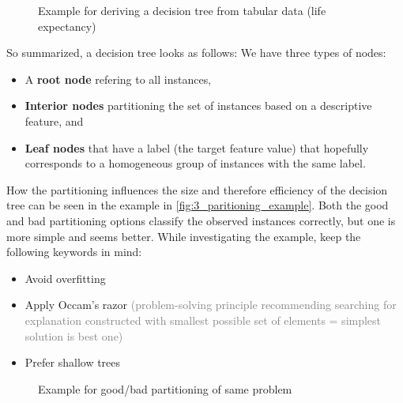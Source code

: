 \begin{figure}[h]
  \centering
  \caption{Example for deriving a decision tree from tabular data (life expectancy)}
  \label{fig:3_smoke_tree_example}
\end{figure}

So summarized, a decision tree looks as follows: We have three types of nodes:
\begin{itemize}
  \item A \textbf{root node} refering to all instances,
  \item \textbf{Interior nodes} partitioning the set of instances based on a descriptive feature, and
  \item \textbf{Leaf nodes} that have a label (the target feature value) that hopefully corresponds to a homogeneous group of instances with the same label.
\end{itemize}

How the partitioning influences the size and therefore efficiency of the decision tree can be seen in the example in \ref{fig:3_paritioning_example}. Both the good and bad partitioning options classify the observed instances correctly, but one is more simple and seems better. While investigating the example, keep the following keywords in mind:
\begin{itemize}
  \item Avoid overfitting
  \item Apply Occam's razor \textcolor{gray}{\footnotesize (problem-solving principle recommending searching for explanation constructed with smallest possible set of elements = simplest solution is best one)}
  \item Prefer shallow trees
\end{itemize}

\begin{figure}[h]
  \centering
  \caption{Example for good/bad partitioning of same problem}
  \label{fig:3_partitioning_example}
\end{figure}
